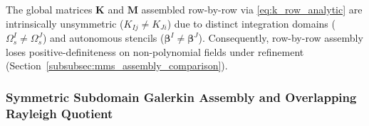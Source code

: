\documentclass[VANCOUVER]{USG}
\begin{document}
\begin{remark}
    The global matrices $\mathbf{K}$ and $\mathbf{M}$ assembled row-by-row via \eqref{eq:k_row_analytic} are intrinsically unsymmetric ($K_{Ij} \ne K_{Ji}$) \cite{atluri2002meshless, liu2001local} due to distinct integration domains ($\Omega_s^I \ne \Omega_s^J$) and autonomous stencils ($\boldsymbol{\beta}^I \ne \boldsymbol{\beta}^J$). Consequently, row-by-row assembly loses positive-definiteness on non-polynomial fields under refinement (Section~\ref{subsubsec:mms_assembly_comparison}).
\end{remark}

\subsubsection{Symmetric Subdomain Galerkin Assembly and Overlapping Rayleigh Quotient}
\label{subsubsec:symmetric_assembly}
\end{document}

